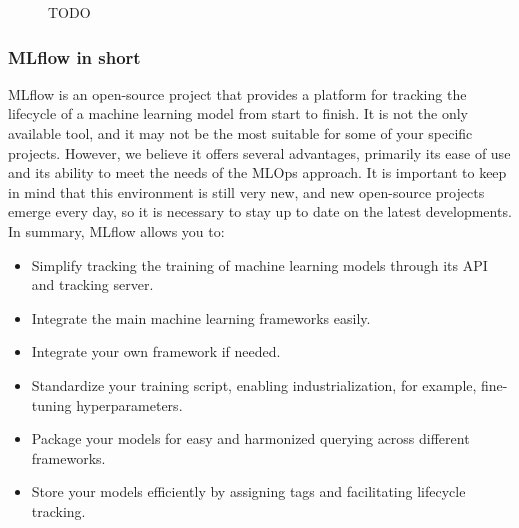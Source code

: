 \begin{figure}[htbp]
    \centering
    \caption{TODO}
    \label{fig:mlflow-registry}
\end{figure}

\subsubsection{MLflow in short}

MLflow is an open-source project that provides a platform for tracking the lifecycle of a machine learning model from start to finish. It is not the only available tool, and it may not be the most suitable for some of your specific projects. However, we believe it offers several advantages, primarily its ease of use and its ability to meet the needs of the MLOps approach. It is important to keep in mind that this environment is still very new, and new open-source projects emerge every day, so it is necessary to stay up to date on the latest developments. In summary, MLflow allows you to:

\begin{itemize}
    \item Simplify tracking the training of machine learning models through its API and tracking server.
    \item Integrate the main machine learning frameworks easily.
    \item Integrate your own framework if needed.
    \item Standardize your training script, enabling industrialization, for example, fine-tuning hyperparameters.
    \item Package your models for easy and harmonized querying across different frameworks.
    \item Store your models efficiently by assigning tags and facilitating lifecycle tracking.
\end{itemize}


